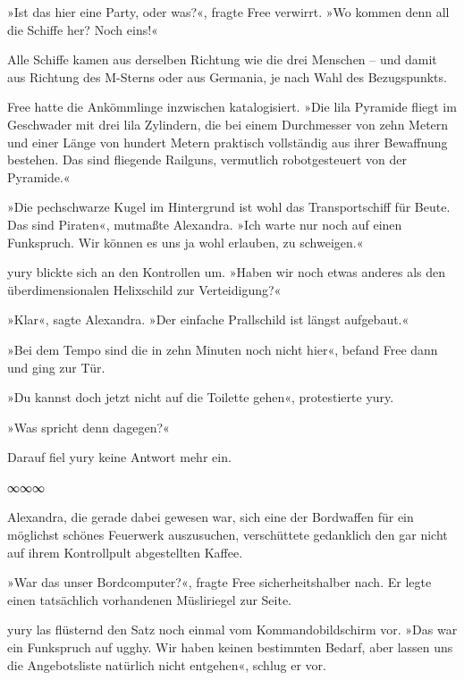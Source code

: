 »Ist das hier eine Party, oder was?«, fragte Free verwirrt. »Wo kommen denn all die Schiffe her? Noch eins!«

Alle Schiffe kamen aus derselben Richtung wie die drei Menschen – und damit aus Richtung des M-Sterns oder aus Germania, je nach Wahl des Bezugspunkts.

Free hatte die Ankömmlinge inzwischen katalogisiert. »Die lila Pyramide fliegt im Geschwader mit drei lila Zylindern, die bei einem Durchmesser von zehn Metern und einer Länge von hundert Metern praktisch vollständig aus ihrer Bewaffnung bestehen. Das sind fliegende Railguns, vermutlich robotgesteuert von der Pyramide.«

»Die pechschwarze Kugel im Hintergrund ist wohl das Transportschiff für Beute. Das sind Piraten«, mutmaßte Alexandra. »Ich warte nur noch auf einen Funkspruch. Wir können es uns ja wohl erlauben, zu schweigen.«

yury blickte sich an den Kontrollen um. »Haben wir noch etwas anderes als den überdimensionalen Helixschild zur Verteidigung?«

»Klar«, sagte Alexandra. »Der einfache Prallschild ist längst aufgebaut.«

»Bei dem Tempo sind die in zehn Minuten noch nicht hier«, befand Free dann und ging zur Tür.

»Du kannst doch jetzt nicht auf die Toilette gehen«, protestierte yury.

»Was spricht denn dagegen?«

Darauf fiel yury keine Antwort mehr ein.

\begin{center}
	∞∞∞
\end{center}


Alexandra, die gerade dabei gewesen war, sich eine der Bordwaffen für ein möglichst schönes Feuerwerk auszusuchen, verschüttete gedanklich den gar nicht auf ihrem Kontrollpult abgestellten Kaffee.

»War das unser Bordcomputer?«, fragte Free sicherheitshalber nach. Er legte einen tatsächlich vorhandenen Müsliriegel zur Seite.

yury las flüsternd den Satz noch einmal vom Kommandobildschirm vor. »Das war ein Funkspruch auf ugghy. Wir haben keinen bestimmten Bedarf, aber lassen uns die Angebotsliste natürlich nicht entgehen«, schlug er vor.

